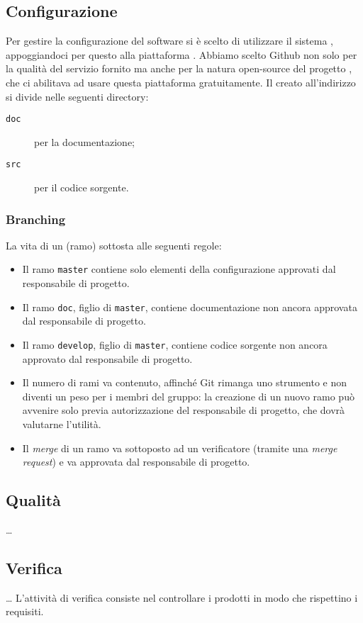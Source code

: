 \begin{itemize}
\subsection{Configurazione} \label{sec:config}
Per gestire la configurazione del software si è scelto di utilizzare il sistema , appoggiandoci per questo alla piattaforma . Abbiamo scelto Github non solo per la qualità del servizio fornito ma anche per la natura open-source del progetto \proj, che ci abilitava ad usare questa piattaforma gratuitamente. Il  creato all'indirizzo \repo{} si divide nelle seguenti directory:
\begin{description}
	\item[\texttt{doc}] per la documentazione;
	\item[\texttt{src}] per il codice sorgente.
\end{description}

\subsubsection{Branching} La vita di un  (ramo) sottosta alle seguenti regole:
\begin{itemize}
	\item Il ramo \texttt{master} contiene solo elementi della configurazione approvati dal responsabile di progetto.
	\item Il ramo \texttt{doc}, figlio di \texttt{master}, contiene documentazione non ancora approvata dal responsabile di progetto.
	\item Il ramo \texttt{develop}, figlio di \texttt{master}, contiene codice sorgente non ancora approvato dal responsabile di progetto.
	\item Il numero di rami va contenuto, affinché Git rimanga uno strumento e non diventi un peso per i membri del gruppo: la creazione di un nuovo ramo può avvenire solo previa autorizzazione del responsabile di progetto, che dovrà valutarne l'utilità.
	\item Il \emph{merge} di un ramo va sottoposto ad un verificatore (tramite una \emph{merge request}) e va approvata dal responsabile di progetto.
\end{itemize}

\subsection{Qualità} \dots

\subsection{Verifica} \dots
    L'attività di verifica consiste nel controllare i prodotti in modo che rispettino i requisiti.

\end{itemize}
